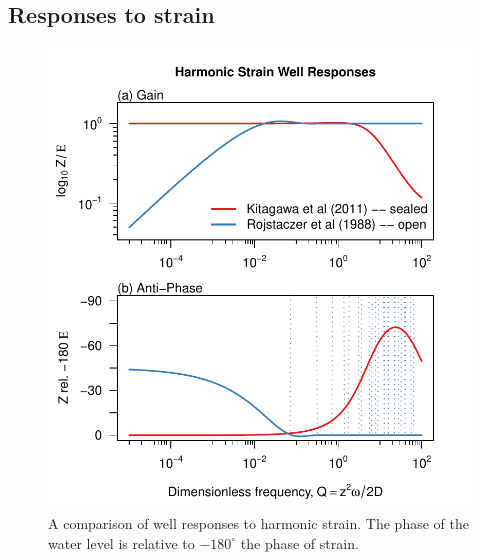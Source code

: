 \documentclass[12pt]{article}\usepackage[]{graphicx}\usepackage[]{color}
\makeatletter
\def\maxwidth{ %
  \ifdim\Gin@nat@width>\linewidth
    \linewidth
  \else
    \Gin@nat@width
  \fi
}
\newenvironment{knitrout}{}{} %
\makeatother
\begin{document}
\subsection{Responses to strain}
\begin{figure}[htb!]
\begin{center}
\begin{knitrout}\small
{}\color{fgcolor}
\includegraphics[width=\maxwidth]{figure/ALLRESPFIG-1} 

\end{knitrout}
\caption{A comparison of well responses to harmonic strain. 
The phase of the water level is relative to $-180^\circ$ the phase of strain.}
\label{fig:ewrsp-all}
\end{center}
\end{figure}

\clearpage
\end{document}
